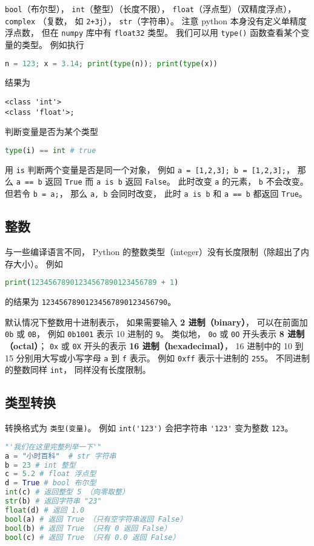 \verb|bool|（布尔型）， \verb|int|（整型）（长度不限）， \verb|float|（浮点型）（双精度浮点）， \verb|complex| （复数， 如 \verb|2+3j|）， \verb|str|（字符串）。 注意 python 本身没有定义单精度浮点数， 但在 \verb|numpy| 库中有 \verb|float32| 类型。 我们可以用 \verb|type()| 函数查看某个变量的类型。 例如执行
\begin{lstlisting}[language=python]
n = 123; x = 3.14; print(type(n)); print(type(x))
\end{lstlisting}
结果为
\begin{lstlisting}[language=none]
<class 'int'>
<class 'float'>;
\end{lstlisting}
判断变量是否为某个类型
\begin{lstlisting}[language=python]
type(i) == int # true
\end{lstlisting}

用 \verb|is| 判断两个变量是否是同一个对象， 例如 \verb|a = [1,2,3]; b = [1,2,3];|， 那么 \verb|a == b| 返回 \verb|True| 而 \verb|a is b| 返回 \verb|False|。 此时改变 \verb|a| 的元素， \verb|b| 不会改变。 但若令 \verb|b = a;|， 那么 \verb|a, b| 会同时改变， 此时 \verb|a is b| 和 \verb|a == b| 都返回 \verb|True|。

\subsection{整数}
与一些编译语言不同， Python 的整数类型（integer）没有长度限制（除超出了内存大小）。 例如
\begin{lstlisting}[language=python]
print(12345678901234567890123456789 + 1)
\end{lstlisting}
的结果为 \verb|12345678901234567890123456790|。

默认情况下整数用十进制表示， 如果需要输入 \textbf{2 进制（binary）}， 可以在前面加 \verb|0b| 或 \verb|0B|， 例如 \verb|0b1001| 表示 10 进制的 \verb|9|。 类似地， \verb|0o| 或 \verb|0O| 开头表示 \textbf{8 进制（octal）}； \verb|0x| 或 \verb|0X| 开头的表示 \textbf{16 进制（hexadecimal）}， 16 进制中的 10 到 15 分别用大写或小写字母 \verb|a| 到 \verb|f| 表示。 例如 \verb|0xff| 表示十进制的 \verb|255|。 不同进制的整数同样 \verb|int|， 同样没有长度限制。

\subsection{类型转换}
转换格式为 \verb|类型(变量)|。 例如 \verb|int('123')| 会把字符串 \verb|'123'| 变为整数 \verb|123|。
\begin{lstlisting}[language=python]
"'我们在这里完整列举一下'"
a = "小时百科"  # str 字符串
b = 23 # int 整型
c = 5.2 # float 浮点型
d = True # bool 布尔型
int(c) # 返回整型 5 （向零取整）
str(b) # 返回字符串 "23"
float(d) # 返回 1.0
bool(a) # 返回 True （只有空字符串返回 False）
bool(b) # 返回 True （只有 0 返回 False）
bool(c) # 返回 True （只有 0.0 返回 False）
\end{lstlisting}

